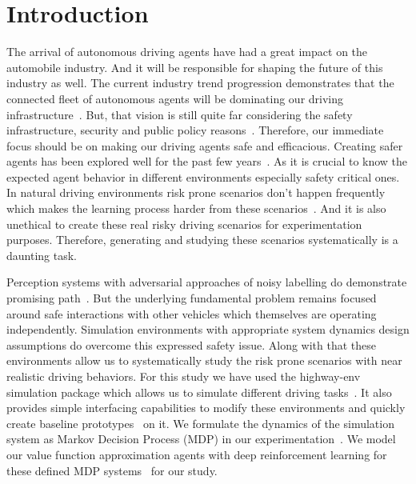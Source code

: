 \documentclass[a4, conference]{IEEEtran}
\begin{document}
\section{Introduction}


    The arrival of autonomous driving agents have had a great impact on the automobile industry. And it will be responsible for shaping the future of this industry as well. The current industry trend progression demonstrates that the connected fleet of autonomous agents will be dominating our driving infrastructure~\cite{elliott2019recent}. But, that vision is still quite far considering the safety infrastructure, security and public policy reasons~\cite{bagloee2016autonomous, joy2017internet, anderson2014autonomous, litman2020autonomous}. Therefore, our immediate focus should be on making our driving agents safe and efficacious. Creating safer agents has been explored well for the past few years~\cite{li2016intelligence, koren2018adaptive, cui2018development, liu2019road, liu2019safe, thorn2018framework, li2019parallel}. As it is crucial to know the expected agent behavior in different environments especially safety critical ones. In natural driving environments risk prone scenarios don't happen frequently which makes the learning process harder from these scenarios~\cite{yan2021distributionally, feng2021intelligent}. And it is also unethical to create these real risky driving scenarios for experimentation purposes. Therefore, generating and studying these scenarios systematically is a daunting task.

    Perception systems with adversarial approaches of noisy labelling do demonstrate promising path~\cite{ding2020learning, eykholt2018robust, xie2017adversarial}. But the underlying fundamental problem remains focused around safe interactions with other vehicles which themselves are operating independently. Simulation environments with appropriate system dynamics design assumptions do overcome this expressed safety issue. Along with that these environments allow us to systematically study the risk prone scenarios with near realistic driving behaviors. For this study we have used the highway-env simulation package which allows us to simulate different driving tasks~\cite{highway-env}. It also provides simple interfacing capabilities to modify these environments and quickly create baseline prototypes~\cite{rl-agents} on it. We formulate the dynamics of the simulation system as Markov Decision Process (MDP) in our experimentation~\cite{leurent2019approximate}. We model our value function approximation agents with deep reinforcement learning for these defined MDP systems~\cite{mnih2013playing, van2016deep} for our study.
\end{document}
